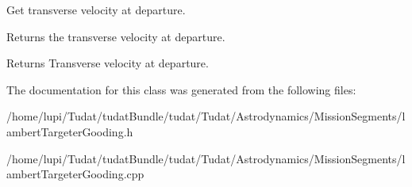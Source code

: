 Get transverse velocity at departure. 

Returns the transverse velocity at departure. \begin{DoxyReturn}{Returns}
Transverse velocity at departure. 
\end{DoxyReturn}


The documentation for this class was generated from the following files\+:\begin{DoxyCompactItemize}
\item 
/home/lupi/\+Tudat/tudat\+Bundle/tudat/\+Tudat/\+Astrodynamics/\+Mission\+Segments/lambert\+Targeter\+Gooding.\+h\item 
/home/lupi/\+Tudat/tudat\+Bundle/tudat/\+Tudat/\+Astrodynamics/\+Mission\+Segments/lambert\+Targeter\+Gooding.\+cpp\end{DoxyCompactItemize}
